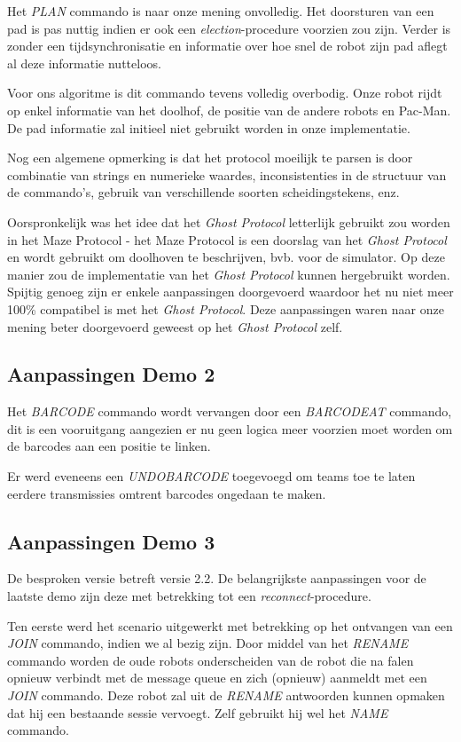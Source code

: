 \documentclass[12pt,a4paper]{report}
\begin{document}
Het \emph{PLAN} commando is naar onze mening onvolledig. Het doorsturen van een pad is pas nuttig indien er ook een \emph{election}-procedure voorzien zou zijn. Verder is zonder een tijdsynchronisatie en informatie over hoe snel de robot zijn pad aflegt al deze informatie nutteloos.

Voor ons algoritme is dit commando tevens volledig overbodig. Onze robot rijdt op enkel informatie van het doolhof, de positie van de andere robots en Pac-Man. De pad informatie zal initieel niet gebruikt worden in onze implementatie.

Nog een algemene opmerking is dat het protocol moeilijk te parsen is door combinatie van strings en numerieke waardes, inconsistenties in de structuur van de commando's, gebruik van verschillende soorten scheidingstekens, enz.

Oorspronkelijk was het idee dat het \emph{Ghost Protocol} letterlijk gebruikt zou worden in het Maze Protocol - het Maze Protocol is een doorslag van het \emph{Ghost Protocol} en wordt gebruikt om doolhoven te beschrijven, bvb. voor de simulator. Op deze manier zou de implementatie van het \emph{Ghost Protocol} kunnen hergebruikt worden. Spijtig genoeg zijn er enkele aanpassingen doorgevoerd waardoor het nu niet meer 100\% compatibel is met het \emph{Ghost Protocol}. Deze aanpassingen waren naar onze mening beter doorgevoerd geweest op het \emph{Ghost Protocol} zelf.

\subsection{Aanpassingen Demo 2}

Het \emph{BARCODE} commando wordt vervangen door een \emph{BARCODEAT} commando, dit is een vooruitgang aangezien er nu geen logica meer voorzien moet worden om de barcodes aan een positie te linken. 

Er werd eveneens een \emph{UNDOBARCODE} toegevoegd om teams toe te laten eerdere transmissies omtrent barcodes ongedaan te maken.

\subsection{Aanpassingen Demo 3}

De besproken versie betreft versie 2.2. De belangrijkste aanpassingen voor de laatste demo zijn deze met betrekking tot een \emph{reconnect}-procedure.

Ten eerste werd het scenario uitgewerkt met betrekking op het ontvangen van een \emph{JOIN} commando, indien we al bezig zijn. Door middel van het \emph{RENAME} commando worden de oude robots onderscheiden van de robot die na falen opnieuw verbindt met de message queue en zich (opnieuw) aanmeldt met een \emph{JOIN} commando. Deze robot zal uit de \emph{RENAME} antwoorden kunnen opmaken dat hij een bestaande sessie vervoegt. Zelf gebruikt hij wel het \emph{NAME} commando.
\end{document}
